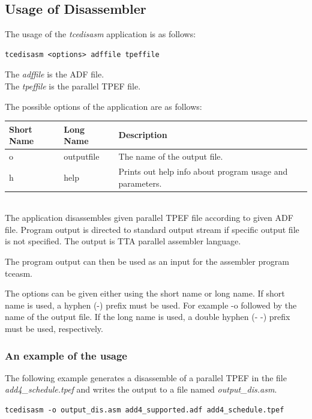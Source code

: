 \documentclass[twoside]{tceusermanual}
\begin{document}
\subsection{Usage of Disassembler}

The usage of the \emph{tcedisasm} application is as follows:

\begin{verbatim}
tcedisasm <options> adffile tpeffile
\end{verbatim}

The \emph{adffile} is the ADF file. \\
The \emph{tpeffile} is the parallel TPEF file.

The possible options of the application are as follows:\\

\begin{tabular}{p{}p{}
                p{}}
\textbf{Short Name} &\textbf{Long Name} &\textbf{Description} \\
\hline
o & outputfile  & The name of the output file.\\
h & help        & Prints out help info about program usage and parameters.\\
\end{tabular}\\

The application disassembles given parallel TPEF file according to given ADF
file. Program output is directed to standard output stream if specific output
file is not specified. The output is TTA parallel assembler language.

The program output can then be used as an input for the assembler program
tceasm.

The options can be given either using the short name or long name. If
short name is used, a hyphen (-) prefix must be used. For example -o
followed by the name of the output file. If the long name is used, a
double hyphen (- -) prefix must be used, respectively.

\subsubsection{An example of the usage}

The following example generates a disassemble of a parallel TPEF in the file
\emph{add4\_schedule.tpef} and writes the output to a file named
\emph{output\_dis.asm}.
 
\begin{verbatim}
tcedisasm -o output_dis.asm add4_supported.adf add4_schedule.tpef 
\end{verbatim}
\end{document}
